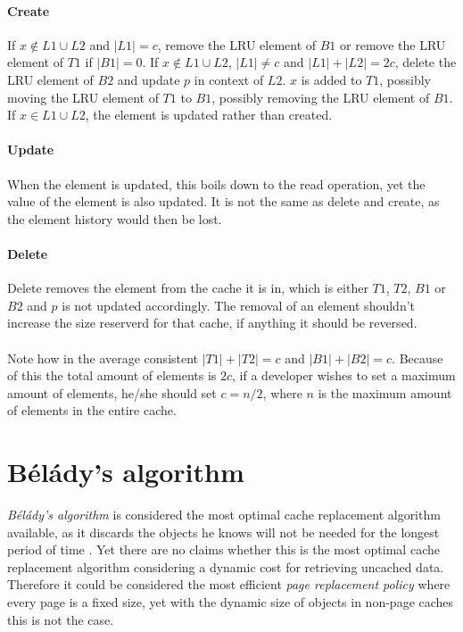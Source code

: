 \documentclass[pdftex,a4paper,12pt,twoside]{report}
\begin{document}
\paragraph{Create} If $x \not \in L1 \cup L2$ and $\left\vert{L1}\right\vert = c$, remove the LRU element of $B1$ or remove the LRU element of $T1$ if $\left\vert{B1}\right\vert = 0$. If $x \not \in L1 \cup L2$, $\left\vert{L1}\right\vert \neq c$ and $\left\vert{L1}\right\vert + \left\vert{L2}\right\vert = 2c$, delete the LRU element of $B2$ and update $p$ in context of $L2$. $x$ is added to $T1$, possibly moving the LRU element of $T1$ to $B1$, possibly removing the LRU element of $B1$. If $x \in L1 \cup L2$, the element is updated rather than created.
\paragraph{Update} When the element is updated, this boils down to the read operation, yet the value of the element is also updated. It is not the same as delete and create, as the element history would then be lost.
\paragraph{Delete} Delete removes the element from the cache it is in, which is either $T1$, $T2$, $B1$ or $B2$ and $p$ is not updated accordingly. The removal of an element shouldn't increase the size reserverd for that cache, if anything it should be reversed.
\\\\
\citep{megiddo2004outperforming} Note how in the average consistent $\left\vert{T1}\right\vert + \left\vert{T2}\right\vert = c$ and $\left\vert{B1}\right\vert + \left\vert{B2}\right\vert = c$. Because of this the total amount of elements is $2c$, if a developer wishes to set a maximum amount of elements, he/she should set $c = n / 2$, where $n$ is the maximum amount of elements in the entire cache.
\section{Bélády's algorithm}
\emph{Bélády's algorithm} is considered the most optimal cache replacement algorithm available, as it discards the objects he knows will not be needed for the longest period of time \citep{cache-algorithm-lru-belady}. Yet there are no claims whether this is the most optimal cache replacement algorithm considering a dynamic cost for retrieving uncached data. Therefore it could be considered the most efficient \emph{page replacement policy} where every page is a fixed size, yet with the dynamic size of objects in non-page caches this is not the case.
\end{document}
